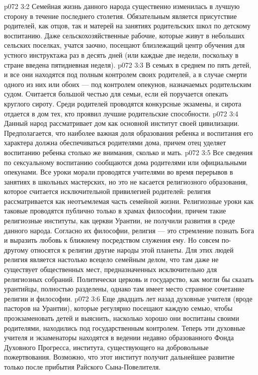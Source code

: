 \vs p072 3:2 Семейная жизнь данного народа существенно изменилась в лучшую сторону в течение последнего столетия. Обязательным является присутствие родителей, как отцов, так и матерей на занятиях родительских школ по детскому воспитанию. Даже сельскохозяйственные рабочие, которые живут в небольших сельских поселках, учатся заочно, посещают близлежащий центр обучения для устного инструктажа раз в десять дней (или каждые две недели, поскольку в стране введена пятидневная неделя).
\vs p072 3:3 В семьях в среднем по пять детей, и все они находятся под полным контролем своих родителей, а в случае смерти одного из них или обоих --- под контролем опекунов, назначаемых родительским судом. Считается большой честью для семьи, если ей поручается опекать круглого сироту. Среди родителей проводятся конкурсные экзамены, и сирота отдается в дом тех, кто проявил лучшие родительские способности.
\vs p072 3:4 \pc Данный народ рассматривает дом как основной институт своей цивилизации. Предполагается, что наиболее важная доля образования ребенка и воспитания его характера должна обеспечиваться родителями дома, причем отец уделяет воспитанию ребенка столько же внимания, сколько и мать.
\vs p072 3:5 Все сведения по сексуальному воспитанию сообщаются дома родителями или официальными опекунами. Все уроки морали проводятся учителями во время перерывов в занятиях в школьных мастерских, но это не касается религиозного образования, которое считается исключительной привилегией родителей: религия рассматривается как неотъемлемая часть семейной жизни. Религиозные уроки как таковые проводятся публично только в храмах философии, причем такие религиозные институты, как церкви Урантии, не получили развития в среде данного народа. Согласно их философии, религия --- это стремление познать Бога и выразить любовь к ближнему посредством служения ему. Но совсем по\hyp{}другому относятся к религии другие народы этой планеты. Для этих людей религия является настолько всецело семейным делом, что там даже не существует общественных мест, предназначенных исключительно для религиозных собраний. Политически церковь и государство, как могли бы сказать урантийцы, полностью разделены, однако там имеет место странное сочетание религии и философии.
\vs p072 3:6 Еще двадцать лет назад духовные учителя (вроде пасторов на Урантии), которые регулярно посещают каждую семью, чтобы проэкзаменовать детей и выяснить, насколько хорошо они воспитаны своими родителями, находились под государственным контролем. Теперь эти духовные учителя и экзаменаторы находятся в ведении недавно образованного Фонда Духовного Прогресса, института, существующего на добровольные пожертвования. Возможно, что этот институт получит дальнейшее развитие только после прибытия Райского Сына\hyp{}Повелителя.
